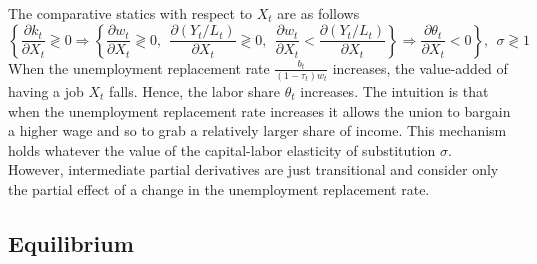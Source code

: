 The comparative statics with respect to $X_t$ are as follows
	\begin{equation*}
	\left\lbrace \frac{\partial k_t}{\partial X_t} \gtrless 0 \Rightarrow 
	\left\lbrace \frac{\partial w_t}{\partial X_t} \gtrless 0,~~
	\frac{\partial (Y_t/L_t)}{\partial X_t} \gtrless 0,~~ \frac{\partial w_t}{\partial X_t} <
	\frac{\partial (Y_t/L_t)}{\partial X_t} \right\rbrace \Rightarrow 
	\frac{\partial \theta_t}{\partial X_t} < 0
	\right\rbrace, ~~ \sigma \gtrless 1
	\end{equation*}
When the unemployment replacement rate $\frac{b_t}{(1-\tau_t)w_t}$ increases, the value-added of having a job $X_t$ falls. Hence, the labor share $\theta_t$ increases. The intuition is that when the unemployment replacement rate increases it allows the union to bargain a higher wage and so to grab a relatively larger share of income. This mechanism holds whatever the value of the capital-labor elasticity of substitution $\sigma$. 
However, intermediate partial derivatives are just transitional and consider only the partial effect of a change in the unemployment replacement rate.


\subsection{Equilibrium}\label{equilibrium}

